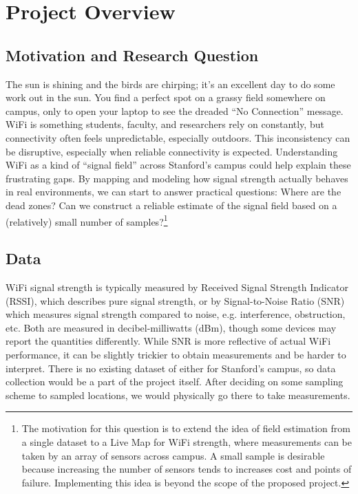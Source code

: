 \documentclass{article}
\begin{document}
\section*{Project Overview}

\subsection*{Motivation and Research Question} The sun is shining and the birds are chirping; it's an excellent day to do some work out in the sun. You find a perfect spot on a grassy field somewhere on campus, only to open your laptop to see the dreaded ``No Connection'' message. WiFi is something students, faculty, and researchers rely on constantly, but connectivity often feels unpredictable, especially outdoors. This inconsistency can be disruptive, especially when reliable connectivity is expected. Understanding WiFi as a kind of “signal field” across Stanford's campus could help explain these frustrating gaps. By mapping and modeling how signal strength actually behaves in real environments, we can start to answer practical questions: Where are the dead zones? Can we construct a reliable estimate of the signal field based on a (relatively) small number of samples?\footnote{\label{1} The motivation for this question is to extend the idea of field estimation from a single dataset to a Live Map for WiFi strength, where measurements can be taken by an array of sensors across campus. A small sample is desirable because increasing the number of sensors tends to increases cost and points of failure. Implementing this idea is beyond the scope of the proposed project.}

\subsection*{Data} WiFi signal strength is typically measured by Received Signal Strength Indicator (RSSI), which describes pure signal strength, or by Signal-to-Noise Ratio (SNR) which measures signal strength compared to noise, e.g. interference, obstruction, etc. Both are measured in decibel-milliwatts (dBm), though some devices may report the quantities differently. While SNR is more reflective of actual WiFi performance, it can be slightly trickier to obtain measurements and be harder to interpret. There is no existing dataset of either for Stanford's campus, so data collection would be a part of the project itself. After deciding on some sampling scheme to sampled locations, we would physically go there to take measurements.
\end{document}
